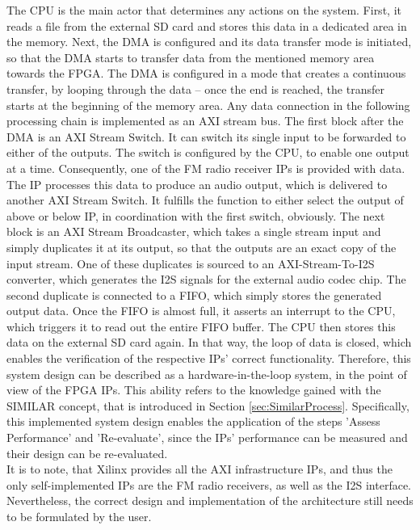 The CPU is the main actor that determines any actions on the system.
First, it reads a file from the external SD card and stores this data in a dedicated area in the memory.
Next, the DMA is configured and its data transfer mode is initiated, so that the DMA starts to transfer data from the mentioned memory area towards the FPGA.
The DMA is configured in a mode that creates a continuous transfer, by looping through the data -- once the end is reached, the transfer starts at the beginning of the memory area.
Any data connection in the following processing chain is implemented as an AXI stream bus.
The first block after the DMA is an AXI Stream Switch.
It can switch its single input to be forwarded to either of the outputs.
The switch is configured by the CPU, to enable one output at a time.
Consequently, one of the FM radio receiver IPs is provided with data.
The IP processes this data to produce an audio output, which is delivered to another AXI Stream Switch.
It fulfills the function to either select the output of above or below IP, in coordination with the first switch, obviously.
The next block is an AXI Stream Broadcaster, which takes a single stream input and simply duplicates it at its output, so that the outputs are an exact copy of the input stream.
One of these duplicates is sourced to an AXI-Stream-To-I2S converter, which generates the I2S signals for the external audio codec chip.
The second duplicate is connected to a FIFO, which simply stores the generated output data.
Once the FIFO is almost full, it asserts an interrupt to the CPU, which triggers it to read out the entire FIFO buffer.
The CPU then stores this data on the external SD card again.
In that way, the loop of data is closed, which enables the verification of the respective IPs' correct functionality.
Therefore, this system design can be described as a hardware-in-the-loop system, in the point of view of the FPGA IPs.
This ability refers to the knowledge gained with the SIMILAR concept, that is introduced in Section \ref{sec:SimilarProcess}.
Specifically, this implemented system design enables the application of the steps 'Assess Performance' and 'Re-evaluate', since the IPs' performance can be measured and their design can be re-evaluated.\\

It is to note, that Xilinx provides all the AXI infrastructure IPs, and thus the only self-implemented IPs are the FM radio receivers, as well as the I2S interface.
Nevertheless, the correct design and implementation of the architecture still needs to be formulated by the user.

